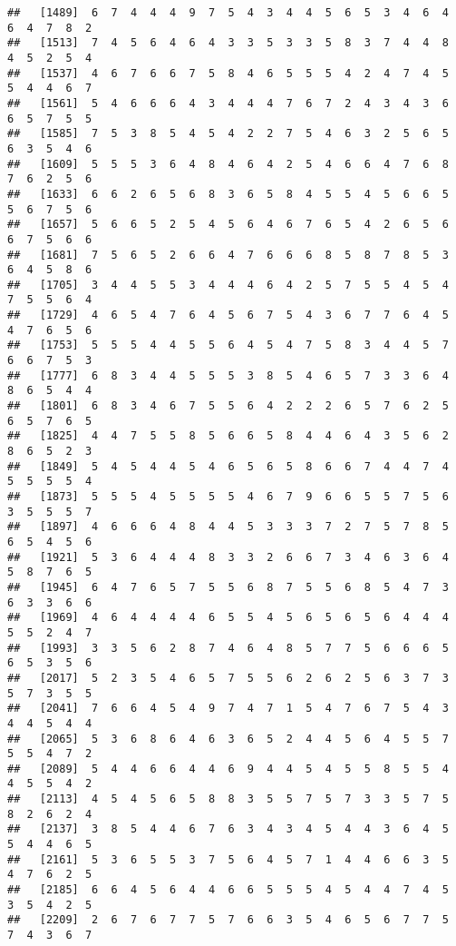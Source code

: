 \documentclass[
]{book}
\begin{document}
\begin{verbatim}
##   [1489]  6  7  4  4  4  9  7  5  4  3  4  4  5  6  5  3  4  6  4  6  4  7  8  2
##   [1513]  7  4  5  6  4  6  4  3  3  5  3  3  5  8  3  7  4  4  8  4  5  2  5  4
##   [1537]  4  6  7  6  6  7  5  8  4  6  5  5  5  4  2  4  7  4  5  5  4  4  6  7
##   [1561]  5  4  6  6  6  4  3  4  4  4  7  6  7  2  4  3  4  3  6  6  5  7  5  5
##   [1585]  7  5  3  8  5  4  5  4  2  2  7  5  4  6  3  2  5  6  5  6  3  5  4  6
##   [1609]  5  5  5  3  6  4  8  4  6  4  2  5  4  6  6  4  7  6  8  7  6  2  5  6
##   [1633]  6  6  2  6  5  6  8  3  6  5  8  4  5  5  4  5  6  6  5  5  6  7  5  6
##   [1657]  5  6  6  5  2  5  4  5  6  4  6  7  6  5  4  2  6  5  6  6  7  5  6  6
##   [1681]  7  5  6  5  2  6  6  4  7  6  6  6  8  5  8  7  8  5  3  6  4  5  8  6
##   [1705]  3  4  4  5  5  3  4  4  4  6  4  2  5  7  5  5  4  5  4  7  5  5  6  4
##   [1729]  4  6  5  4  7  6  4  5  6  7  5  4  3  6  7  7  6  4  5  4  7  6  5  6
##   [1753]  5  5  5  4  4  5  5  6  4  5  4  7  5  8  3  4  4  5  7  6  6  7  5  3
##   [1777]  6  8  3  4  4  5  5  5  3  8  5  4  6  5  7  3  3  6  4  8  6  5  4  4
##   [1801]  6  8  3  4  6  7  5  5  6  4  2  2  2  6  5  7  6  2  5  6  5  7  6  5
##   [1825]  4  4  7  5  5  8  5  6  6  5  8  4  4  6  4  3  5  6  2  8  6  5  2  3
##   [1849]  5  4  5  4  4  5  4  6  5  6  5  8  6  6  7  4  4  7  4  5  5  5  5  4
##   [1873]  5  5  5  4  5  5  5  5  4  6  7  9  6  6  5  5  7  5  6  3  5  5  5  7
##   [1897]  4  6  6  6  4  8  4  4  5  3  3  3  7  2  7  5  7  8  5  6  5  4  5  6
##   [1921]  5  3  6  4  4  4  8  3  3  2  6  6  7  3  4  6  3  6  4  5  8  7  6  5
##   [1945]  6  4  7  6  5  7  5  5  6  8  7  5  5  6  8  5  4  7  3  6  3  3  6  6
##   [1969]  4  6  4  4  4  4  6  5  5  4  5  6  5  6  5  6  4  4  4  5  5  2  4  7
##   [1993]  3  3  5  6  2  8  7  4  6  4  8  5  7  7  5  6  6  6  5  6  5  3  5  6
##   [2017]  5  2  3  5  4  6  5  7  5  5  6  2  6  2  5  6  3  7  3  5  7  3  5  5
##   [2041]  7  6  6  4  5  4  9  7  4  7  1  5  4  7  6  7  5  4  3  4  4  5  4  4
##   [2065]  5  3  6  8  6  4  6  3  6  5  2  4  4  5  6  4  5  5  7  5  5  4  7  2
##   [2089]  5  4  4  6  6  4  4  6  9  4  4  5  4  5  5  8  5  5  4  4  5  5  4  2
##   [2113]  4  5  4  5  6  5  8  8  3  5  5  7  5  7  3  3  5  7  5  8  2  6  2  4
##   [2137]  3  8  5  4  4  6  7  6  3  4  3  4  5  4  4  3  6  4  5  5  4  4  6  5
##   [2161]  5  3  6  5  5  3  7  5  6  4  5  7  1  4  4  6  6  3  5  4  7  6  2  5
##   [2185]  6  6  4  5  6  4  4  6  6  5  5  5  4  5  4  4  7  4  5  3  5  4  2  5
##   [2209]  2  6  7  6  7  7  5  7  6  6  3  5  4  6  5  6  7  7  5  7  4  3  6  7

\end{verbatim}
\end{document}
